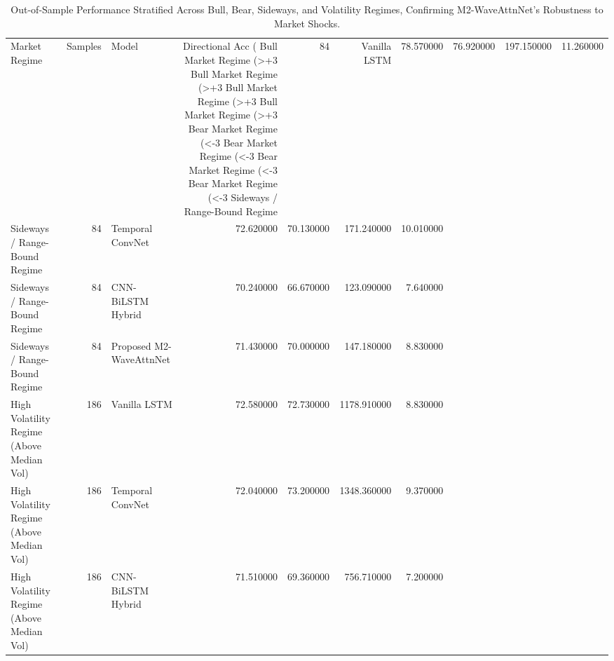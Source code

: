 \begin{table}
\caption{Out-of-Sample Performance Stratified Across Bull, Bear, Sideways, and Volatility Regimes, Confirming M2-WaveAttnNet's Robustness to Market Shocks.}
\label{tab:regime_breakdown}
\begin{tabular}{lrlrrrr}
\toprule
Market Regime & Samples & Model & Directional Acc (%
\midrule
Bull Market Regime (>+3%
Bull Market Regime (>+3%
Bull Market Regime (>+3%
Bull Market Regime (>+3%
Bear Market Regime (<-3%
Bear Market Regime (<-3%
Bear Market Regime (<-3%
Bear Market Regime (<-3%
Sideways / Range-Bound Regime & 84 & Vanilla LSTM & 78.570000 & 76.920000 & 197.150000 & 11.260000 \\
Sideways / Range-Bound Regime & 84 & Temporal ConvNet & 72.620000 & 70.130000 & 171.240000 & 10.010000 \\
Sideways / Range-Bound Regime & 84 & CNN-BiLSTM Hybrid & 70.240000 & 66.670000 & 123.090000 & 7.640000 \\
Sideways / Range-Bound Regime & 84 & Proposed M2-WaveAttnNet & 71.430000 & 70.000000 & 147.180000 & 8.830000 \\
High Volatility Regime (Above Median Vol) & 186 & Vanilla LSTM & 72.580000 & 72.730000 & 1178.910000 & 8.830000 \\
High Volatility Regime (Above Median Vol) & 186 & Temporal ConvNet & 72.040000 & 73.200000 & 1348.360000 & 9.370000 \\
High Volatility Regime (Above Median Vol) & 186 & CNN-BiLSTM Hybrid & 71.510000 & 69.360000 & 756.710000 & 7.200000 \\

\end{tabular}
\end{table}
